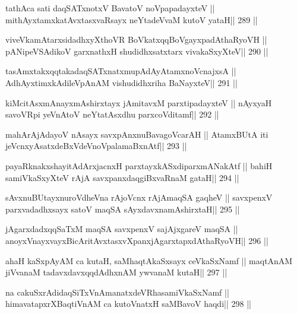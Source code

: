 \begin{shl}
tathAca sati daqSATxnotxV BavatoV noVpapadayxteV ||
mithAyxtamxkatAvxtasxvaRsayx neYtadeVvaM kutoV yataH\hfill || 289 ||
\end{shl}

\begin{shl}
viveVkamAtarxsidadhxyXthoVR BoVkatxqqBoVgayxpadAthaRyoVH ||
pANipeVSAdikoV garxnathxH shudidhxsatxtarx vivakaSxyXteV\hfill || 290 ||
\end{shl}

\begin{shl}
tasAmxtakxqqtakadaqSATxnatxmupAdAyA\s\s tamxnoV\s cnajxsA ||
AdhAyxtimxkAdileVpAnAM vishudidhxriha BaNayxteV\hfill || 291 ||
\end{shl}

\begin{shl}
kiMcitAsxmAnayxmAshirxtayx jAmitavxM parxtipadayxteV ||
nAyxyaH savoVR\s pi yeVnAtoV neYtatAsxdhu parxcoVditamf\hfill || 292 ||
\end{shl}

\begin{shl}
mahArAjAdayoV nAsayx savxpAnxnuBavagoVcarAH ||
AtamxBUtA iti jeVcnxyAsatxdeBxVdeVnoVpalamaBxnAtf\hfill || 293 ||
\end{shl}

\begin{shl}
payaRknakxshayitAdArxjacnxH parxtayxkASxdiparxmANakAtf ||
bahiH samiVkaSxyXteV rAjA savxpanxdaqgiBxvaRnaM gataH\hfill || 294 ||
\end{shl}

\begin{shl}
sAvxnuBUtayxnuroVdheVna rAjoVcnx rAjA\s maqSA gaqheV ||
savxpenxV parxvadadhxsayx satoV maqSA sAyxdavxnamAshirxtaH\hfill || 295 ||
\end{shl}

\begin{shl}
jAgarxdadxqqSaTxM maqSA savxpenxV sajAjxgareV maqSA ||
anoyxVnayxvayxBicAritAvxtasxvXpanxjAgarxtapxdAthaRyoVH\hfill || 296 ||
\end{shl}

\begin{shl}
ahaH kaSxpAyAM ca kutaH, saMhaqtAkaSxsayx ceVkaSxNamf ||
maqtAnAM jiVvanaM tadavxdavxqqdAdhxnAM ywvanaM kutaH\hfill || 297 ||
\end{shl}

\begin{shl}
na cakuSxrAdidaqSiTxVnAmanatxdeVRhasamiVkaSxNamf ||
himavatapxrXBaqtiVnAM ca kutoV\s natxH saMBavoV haqdi\hfill || 298 ||
\end{shl}

